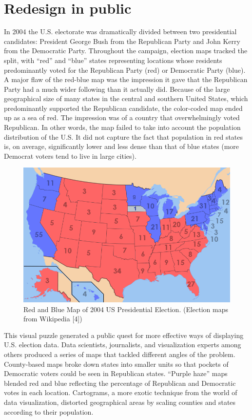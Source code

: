 \documentclass[sigconf,nonacm,screen,pbalance]{acmart}
\begin{document}
\section{Redesign in public}
In 2004 the U.S. electorate was dramatically divided between
two presidential candidates: President George Bush from the Republican Party and John
Kerry from the Democratic Party. Throughout the campaign, election maps tracked the split,
with ``red'' and ``blue'' states representing locations whose residents predominantly voted
for the Republican Party (red) or Democratic Party (blue). A major flaw of the red-blue
map was the impression it gave that the Republican Party had a much wider following than
it actually did. Because of the large geographical size of many states in the central and
southern United States, which predominantly supported the Republican candidate, the
color-coded map ended up as a sea of red. The impression was of a country that
overwhelmingly voted Republican. In other words, the map
failed to take into account the population distribution of the U.S. It did not capture the
fact that population in red states is, on average, significantly lower and less dense than
that of blue states (more Democrat voters tend to live in large cities).

\begin{figure}[ht]
\centering
\includegraphics[width=\columnwidth]{1_7rY2a4CFDnJO2GmtoS37qQ.png}
\vspace{-20pt}
\caption{Red and Blue Map of 2004 US Presidential Election. (Election maps from Wikipedia [4])}
\end{figure}
This visual puzzle generated a public quest for more
effective ways of displaying U.S. election data. Data scientists, journalists, and
visualization experts among others produced a series of maps that tackled different angles
of the problem. County-based maps broke down states into smaller units so that pockets of
Democratic voters could be seen in Republican states. ``Purple haze'' maps blended red and
blue reflecting the percentage of Republican and Democratic votes in each location.
Cartograms, a more exotic technique from the world of data visualization, distorted
geographical areas by scaling counties and states according to their population.
\end{document}
